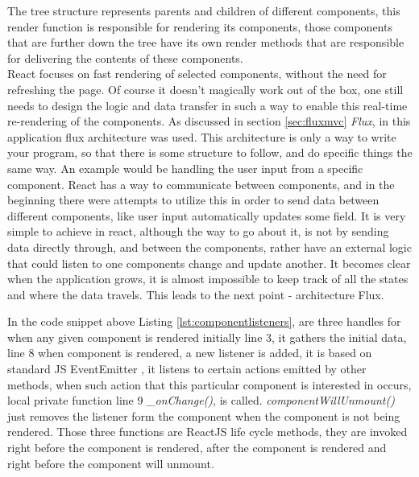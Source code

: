 The tree structure represents parents and children of different components, this render function is responsible for rendering its components, those components that are further down the tree have its own render methods that are responsible for delivering the contents of these components.
\\React focuses on fast rendering of selected components, without the need for refreshing the page. Of course it doesn't magically work out of the box, one still needs to design the logic and data transfer in such a way to enable this real-time re-rendering of the components. As discussed in section \ref{sec:fluxmvc} \emph{Flux}, in this application flux architecture was used. This architecture is only a way to write your program, so that there is some structure to follow, and do specific things the same way. An example would be handling the user input from a specific component. React has a way to communicate between components, and in the beginning there were attempts to utilize this in order to send data between different components, like user input automatically updates some field. It is very simple to achieve in react, although the way to go about it, is not by sending data directly through, and between the components, rather have an external logic that could listen to one components change and update another. It becomes clear when the application grows, it is almost impossible to keep track of all the states and where the data travels. This leads to the next point - architecture Flux.



In the code snippet above Listing \ref{lst:componentlisteners}, are three handles for when any given component is rendered initially line 3, it gathers the initial data, line 8 when component is rendered, a new listener is added, it is based on standard JS EventEmitter \cite{eventlistener}, it listens to certain actions emitted by other methods, when such action that this particular component is interested in occurs, local private function line 9 \emph{\_onChange()}, is called. \emph{componentWillUnmount()} just removes the listener form the component when the component is not being rendered.
Those three functions are ReactJS life cycle methods, they are invoked right before the component is rendered, after the component is rendered and right before the component will unmount.




